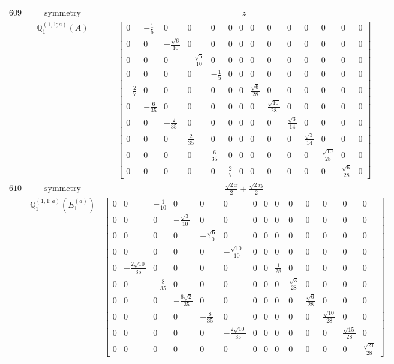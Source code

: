 \documentclass[fleqn,8pt,landscape]{jsarticle}
\begin{document}
\begin{longtable}{ccc}
$ 609 $ & $ \text{symmetry} $ & $ z $ \\
$  $ & $ \mathbb{Q}_{1}^{(1,1;a)}(A) $ & $ \begin{bmatrix} 0 & - \frac{1}{5} & 0 & 0 & 0 & 0 & 0 & 0 & 0 & 0 & 0 & 0 & 0 & 0 \\ 0 & 0 & - \frac{\sqrt{6}}{10} & 0 & 0 & 0 & 0 & 0 & 0 & 0 & 0 & 0 & 0 & 0 \\ 0 & 0 & 0 & - \frac{\sqrt{6}}{10} & 0 & 0 & 0 & 0 & 0 & 0 & 0 & 0 & 0 & 0 \\ 0 & 0 & 0 & 0 & - \frac{1}{5} & 0 & 0 & 0 & 0 & 0 & 0 & 0 & 0 & 0 \\ - \frac{2}{7} & 0 & 0 & 0 & 0 & 0 & 0 & \frac{\sqrt{6}}{28} & 0 & 0 & 0 & 0 & 0 & 0 \\ 0 & - \frac{6}{35} & 0 & 0 & 0 & 0 & 0 & 0 & \frac{\sqrt{10}}{28} & 0 & 0 & 0 & 0 & 0 \\ 0 & 0 & - \frac{2}{35} & 0 & 0 & 0 & 0 & 0 & 0 & \frac{\sqrt{3}}{14} & 0 & 0 & 0 & 0 \\ 0 & 0 & 0 & \frac{2}{35} & 0 & 0 & 0 & 0 & 0 & 0 & \frac{\sqrt{3}}{14} & 0 & 0 & 0 \\ 0 & 0 & 0 & 0 & \frac{6}{35} & 0 & 0 & 0 & 0 & 0 & 0 & \frac{\sqrt{10}}{28} & 0 & 0 \\ 0 & 0 & 0 & 0 & 0 & \frac{2}{7} & 0 & 0 & 0 & 0 & 0 & 0 & \frac{\sqrt{6}}{28} & 0 \end{bmatrix} $ \\ \hline
$ 610 $ & $ \text{symmetry} $ & $ \frac{\sqrt{2} x}{2} + \frac{\sqrt{2} i y}{2} $ \\
$  $ & $ \mathbb{Q}_{1}^{(1,1;a)}(E_{1}^{(a)}) $ & $ \begin{bmatrix} 0 & 0 & - \frac{1}{10} & 0 & 0 & 0 & 0 & 0 & 0 & 0 & 0 & 0 & 0 & 0 \\ 0 & 0 & 0 & - \frac{\sqrt{3}}{10} & 0 & 0 & 0 & 0 & 0 & 0 & 0 & 0 & 0 & 0 \\ 0 & 0 & 0 & 0 & - \frac{\sqrt{6}}{10} & 0 & 0 & 0 & 0 & 0 & 0 & 0 & 0 & 0 \\ 0 & 0 & 0 & 0 & 0 & - \frac{\sqrt{10}}{10} & 0 & 0 & 0 & 0 & 0 & 0 & 0 & 0 \\ 0 & - \frac{2 \sqrt{10}}{35} & 0 & 0 & 0 & 0 & 0 & 0 & \frac{1}{28} & 0 & 0 & 0 & 0 & 0 \\ 0 & 0 & - \frac{8}{35} & 0 & 0 & 0 & 0 & 0 & 0 & \frac{\sqrt{3}}{28} & 0 & 0 & 0 & 0 \\ 0 & 0 & 0 & - \frac{6 \sqrt{2}}{35} & 0 & 0 & 0 & 0 & 0 & 0 & \frac{\sqrt{6}}{28} & 0 & 0 & 0 \\ 0 & 0 & 0 & 0 & - \frac{8}{35} & 0 & 0 & 0 & 0 & 0 & 0 & \frac{\sqrt{10}}{28} & 0 & 0 \\ 0 & 0 & 0 & 0 & 0 & - \frac{2 \sqrt{10}}{35} & 0 & 0 & 0 & 0 & 0 & 0 & \frac{\sqrt{15}}{28} & 0 \\ 0 & 0 & 0 & 0 & 0 & 0 & 0 & 0 & 0 & 0 & 0 & 0 & 0 & \frac{\sqrt{21}}{28} \end{bmatrix} $ \\ \hline

\end{longtable}
\end{document}
